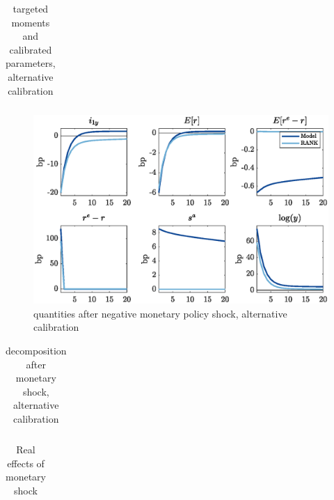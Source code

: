 \documentclass[12pt]{article}
\begin{document}
\pagebreak

\begin{table}[H]
\centering
\bgroup
\def\arraystretch{1.25}
\begin{tabular}{clclcc} \hline

\end{tabular}
\egroup
\renewcommand\thetable{A.IV}
\caption{targeted moments and calibrated parameters, alternative calibration}
\end{table}

\begin{figure}[H]
\centering
\includegraphics[width=\textwidth,clip=true,trim=0 20 0 10]{../output/figures/interm_compact_fig}
\renewcommand\thefigure{A.5}
\caption{quantities after negative monetary policy shock, alternative calibration}
\end{figure}

\vspace{20pt}

\begin{table}[H]
\centering
\bgroup
\def\arraystretch{1.25}
\begin{tabular}{lC{35mm}C{18mm}C{17mm}} \hline

\end{tabular}
\egroup
\renewcommand\thetable{A.V}
\caption{decomposition after monetary shock, alternative calibration}
\end{table}

\vspace{10pt}

\begin{table}[H]
\centering
\bgroup
\def\arraystretch{1.25}
\begin{tabular}{lC{18mm}C{18mm}C{25mm}} \hline

\end{tabular}
\egroup
\caption*{Real effects of monetary shock}
\end{table}
\end{document}

